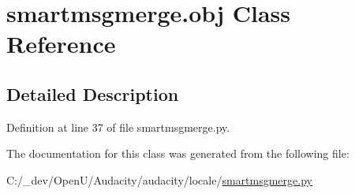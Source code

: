 \hypertarget{classsmartmsgmerge_1_1obj}{}\section{smartmsgmerge.\+obj Class Reference}
\label{classsmartmsgmerge_1_1obj}


\subsection{Detailed Description}


Definition at line 37 of file smartmsgmerge.\+py.



The documentation for this class was generated from the following file\+:\begin{DoxyCompactItemize}
\item 
C\+:/\+\_\+dev/\+Open\+U/\+Audacity/audacity/locale/\hyperlink{smartmsgmerge_8py}{smartmsgmerge.\+py}\end{DoxyCompactItemize}

